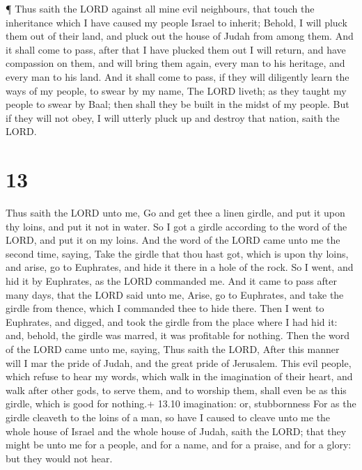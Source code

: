  ¶ Thus saith the LORD against all mine evil neighbours,
that touch the inheritance which I have caused my people Israel to
inherit; Behold, I will pluck them out of their land, and pluck out the
house of Judah from among them.  And it shall come to pass,
after that I have plucked them out I will return, and have compassion on
them, and will bring them again, every man to his heritage, and every
man to his land.  And it shall come to pass, if they will
diligently learn the ways of my people, to swear by my name, The LORD
liveth; as they taught my people to swear by Baal; then shall they be
built in the midst of my people.  But if they will not
obey, I will utterly pluck up and destroy that nation, saith the LORD.

\hypertarget{section-12}{%
\section{13}\label{section-12}}

 Thus saith the LORD unto me, Go and get thee a linen
girdle, and put it upon thy loins, and put it not in water. 
So I got a girdle according to the word of the LORD, and put it on my
loins.  And the word of the LORD came unto me the second
time, saying,  Take the girdle that thou hast got, which is
upon thy loins, and arise, go to Euphrates, and hide it there in a hole
of the rock.  So I went, and hid it by Euphrates, as the
LORD commanded me.  And it came to pass after many days,
that the LORD said unto me, Arise, go to Euphrates, and take the girdle
from thence, which I commanded thee to hide there.  Then I
went to Euphrates, and digged, and took the girdle from the place where
I had hid it: and, behold, the girdle was marred, it was profitable for
nothing.  Then the word of the LORD came unto me, saying,
 Thus saith the LORD, After this manner will I mar the pride
of Judah, and the great pride of Jerusalem.  This evil
people, which refuse to hear my words, which walk in the imagination of
their heart, and walk after other gods, to serve them, and to worship
them, shall even be as this girdle, which is good for nothing.+ 13.10
imagination: or, stubbornness  For as the girdle cleaveth
to the loins of a man, so have I caused to cleave unto me the whole
house of Israel and the whole house of Judah, saith the LORD; that they
might be unto me for a people, and for a name, and for a praise, and for
a glory: but they would not hear.

